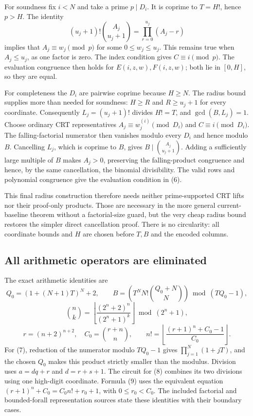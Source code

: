 \documentclass[11pt]{article}
\begin{document}
For soundness fix $i<N$ and take a prime $p\mid D_i$.  It is coprime to
$T=H!$, hence $p>H$.  The identity
\[
 (u_j+1)!{A_j\choose u_j+1}=\prod_{r=0}^{u_j}(A_j-r)
\]
implies that $A_j\equiv w_j\pmod p$ for some $0\le w_j\le u_j$.
This remains true when $A_j\le u_j$, as one factor is zero.  The index
condition gives $C\equiv i\pmod p$.  The evaluation congruence then holds
for $E(i,z,w),F(i,z,w)$; both lie in $[0,H]$, so they are equal.

For completeness the $D_i$ are pairwise coprime because $H\ge N$.
The radius bound supplies more than needed for soundness: $H\ge R$ and
$R\ge u_j+1$ for every coordinate.  Consequently
$L_j=(u_j+1)!$ divides $H!=T$, and $\gcd(B,L_j)=1$.
Choose ordinary CRT representatives
$A_j\equiv w_j^{(i)}\pmod{D_i}$ and $C\equiv i\pmod{D_i}$.
The falling-factorial numerator then vanishes modulo every $D_i$ and
hence modulo $B$.  Cancelling $L_j$, which is coprime to $B$, gives
$B\mid {A_j\choose u_j+1}$.  Adding a sufficiently large multiple of
$B$ makes $A_j>0$, preserving the falling-product congruence and hence,
by the same cancellation, the binomial divisibility.  The valid rows
and polynomial congruence give the evaluation condition in (6).

This final radius construction therefore needs neither prime-supported
CRT lifts nor their proof-only products.  Those are necessary in the more
general current-baseline theorem without a factorial-size guard, but the
very cheap radius bound restores the simpler direct cancellation proof.
There is no circularity: all coordinate bounds and $H$ are chosen before
$T,B$ and the encoded columns.

\subsection{All arithmetic operators are eliminated}

The exact arithmetic identities are
\[
 Q_0=(1+(N+1)T)^N+2,\qquad
 B=\left(T^N N!{Q_0+N\choose N}\right)\bmod(TQ_0-1), \tag{7}
\]
\[
 {n\choose k}=
 \left\lfloor\frac{(2^n+2)^n}{(2^n+1)^k}\right\rfloor\bmod(2^n+1), \tag{8}
\]
\[
 r=(n+2)^{n+2},\quad C_0={r+n\choose n},\qquad
 n!=\left\lfloor\frac{(r+1)^n+C_0-1}{C_0}\right\rfloor. \tag{9}
\]
For (7), reduction of the numerator modulo $TQ_0-1$ gives
$\prod_{j=1}^N(1+jT)$, and the chosen $Q_0$ makes this product strictly
smaller than the modulus.  Division uses $a=dq+r$ and $d=r+s+1$.
The circuit for (8) combines its two divisions using one high-digit
coordinate.  Formula (9) uses the equivalent equation
$(r+1)^n+C_0=C_0 n!+r_0+1$, with $0\le r_0<C_0$.
The included factorial and bounded-forall representation sources state
these identities with their boundary cases.
\end{document}
